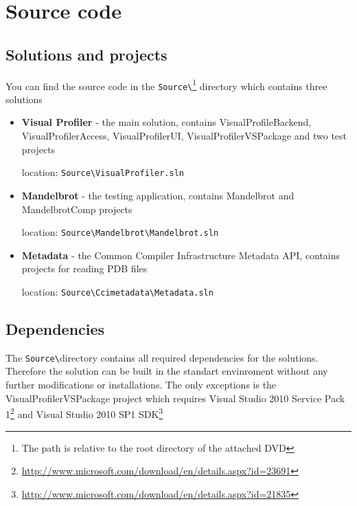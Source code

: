 \chapter{Source code}

\section{Solutions and projects}
You can find the source code in the \texttt{Source\textbackslash}\footnote{The path is relative to the root directory of the attached DVD} directory which contains three solutions
\begin{itemize}

\item \textbf{Visual Profiler} - the main solution, contains VisualProfileBackend, VisualProfilerAccess, VisualProfilerUI, VisualProfilerVSPackage and two test projects

location: \texttt{Source\textbackslash VisualProfiler.sln}\footnotemark[\value{footnote}]

\item \textbf{Mandelbrot} - the testing application, contains Mandelbrot and MandelbrotComp projects

location: \texttt{Source\textbackslash Mandelbrot\textbackslash  Mandelbrot.sln}\footnotemark[\value{footnote}]

\item \textbf{Metadata} - the Common Compiler Infrastructure Metadata API, contains projects for reading PDB files

location: \texttt{Source\textbackslash Ccimetadata\textbackslash  Metadata.sln}\footnotemark[\value{footnote}]

\end{itemize}

\section{Dependencies}
The \texttt{Source\textbackslash}\footnotemark[\value{footnote}] directory contains all required dependencies for the solutions. Therefore the solution can be built in the standart envinroment without any further modifications or installations. The only exceptions is the VisualProfilerVSPackage project which requires Visual Studio 2010 Service Pack 1\footnote{\href{http://www.microsoft.com/download/en/details.aspx?id=23691}{http://www.microsoft.com/download/en/details.aspx?id=23691}} and Visual Studio 2010 SP1 SDK\footnote{\href{http://www.microsoft.com/download/en/details.aspx?id=21835}{http://www.microsoft.com/download/en/details.aspx?id=21835}}

